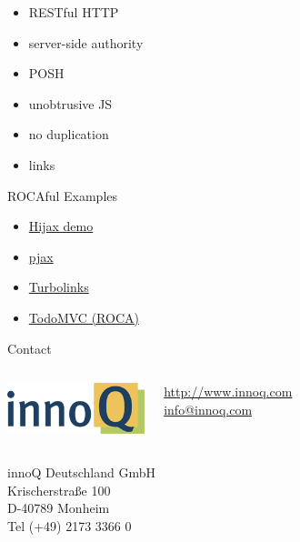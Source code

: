 \documentclass{beamer}
\begin{document}
\begin{frame}{}
  \begin{itemize}
    \item RESTful HTTP
    \item server-side authority
    \item POSH
    \item unobtrusive JS
    \item no duplication
    \item links
  \end{itemize}
\end{frame}

\begin{frame}{ROCAful Examples}
  \begin{itemize}
    \item \href{http://fnd.github.com/hijax-demo/}{Hijax demo}
    \item \href{http://pjax.heroku.com}{pjax}
    \item \href{https://github.com/rails/turbolinks}{Turbolinks}
    \item \href{http://rocatodo.herokuapp.com}{TodoMVC (ROCA)}
  \end{itemize}
\end{frame}

\begin{frame}{Contact}
  \begin{columns}
    \column{5cm}
    \includegraphics[width=4cm]{images/innoQ-Logo-RGB-72dpi.png}
    \vspace{4mm}
    \column{4.5cm}

    \href{http://www.innoq.com}{http://www.innoq.com} \\
    \href{mailto:info@innoq.com}{info@innoq.com}
  \end{columns}

  innoQ Deutschland GmbH \\
  Krischerstraße 100 \\
  D-40789 Monheim \\
  Tel (+49) 2173 3366 0
\end{frame}
\end{document}
